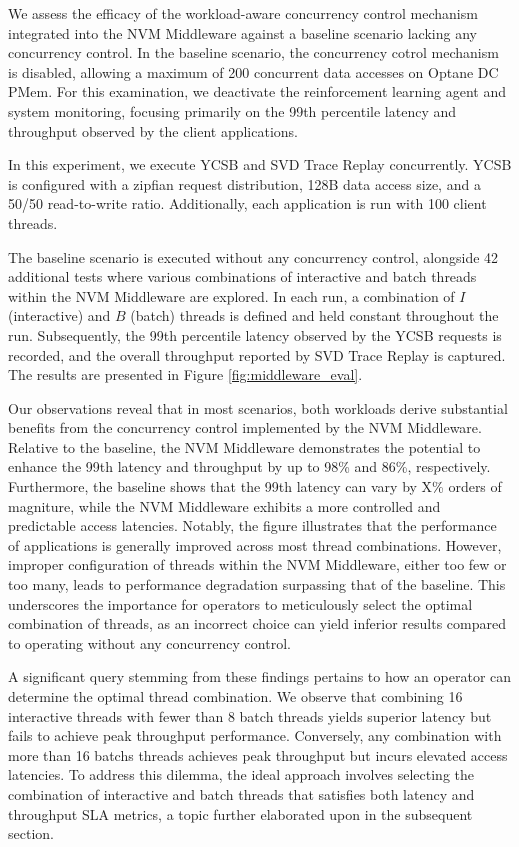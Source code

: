 We assess the efficacy of the workload-aware concurrency control mechanism integrated into the NVM Middleware against a baseline scenario lacking any concurrency control. In the baseline scenario, the concurrency cotrol mechanism is disabled, allowing a maximum of 200 concurrent data accesses on Optane DC PMem. For this examination, we deactivate the reinforcement learning agent and system monitoring, focusing primarily on the 99th percentile latency and throughput observed by the client applications.

In this experiment, we execute YCSB and SVD Trace Replay concurrently. YCSB is configured with a zipfian request distribution, 128B data access size, and a 50/50 read-to-write ratio. Additionally, each application is run with 100 client threads.

The baseline scenario is executed without any concurrency control, alongside 42 additional tests where various combinations of interactive and batch threads within the NVM Middleware are explored. In each run, a combination of $I$ (interactive) and $B$ (batch) threads is defined and held constant throughout the run. Subsequently, the 99th percentile latency observed by the YCSB requests is recorded, and the overall throughput reported by SVD Trace Replay is captured. The results are presented in Figure \ref{fig:middleware_eval}.

Our observations reveal that in most scenarios, both workloads derive substantial benefits from the concurrency control implemented by the NVM Middleware. Relative to the baseline, the NVM Middleware demonstrates the potential to enhance the 99th latency and throughput by up to 98\% and 86\%, respectively. Furthermore, the baseline shows that the 99th latency can vary by X\% orders of magniture, while the NVM Middleware exhibits a more controlled and predictable access latencies. Notably, the figure illustrates that the performance of applications is generally improved across most thread combinations. However, improper configuration of threads within the NVM Middleware, either too few or too many, leads to performance degradation surpassing that of the baseline. This underscores the importance for operators to meticulously select the optimal combination of threads, as an incorrect choice can yield inferior results compared to operating without any concurrency control.

A significant query stemming from these findings pertains to how an operator can determine the optimal thread combination. We observe that combining 16 interactive threads with fewer than 8 batch threads yields superior latency but fails to achieve peak throughput performance. Conversely, any combination with more than 16 batchs threads achieves peak throughput but incurs elevated access latencies. To address this dilemma, the ideal approach involves selecting the combination of interactive and batch threads that satisfies both latency and throughput SLA metrics, a topic further elaborated upon in the subsequent section.

